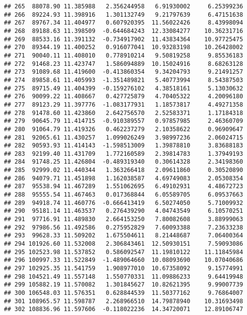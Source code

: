 \documentclass[
]{article}
\begin{document}
\begin{verbatim}
## 265  88078.90 11.385988   2.356244958   6.91930002     6.25399236
## 266  89224.93 11.398916   1.301132749   9.21797639     6.47151638
## 267  89767.34 11.404977   0.607920395  11.56022426     8.43998094
## 268  89188.63 11.398509  -0.644684243  12.33084277    10.36231716
## 269  88533.16 11.391132  -0.734917902  11.43834364    10.97725475
## 270  89344.19 11.400252   0.916077041  10.93283198    10.26428002
## 271  90040.11 11.408010   0.778910214   9.50819258     9.85536183
## 272  91468.23 11.423747   1.586094889  10.15024916     8.68263128
## 273  91089.68 11.419600  -0.413860354   9.34204793     9.21491257
## 274  89858.61 11.405993  -1.351489821   5.40773994     8.54387503
## 275  89715.49 11.404399  -0.159276102   4.38518161     5.13030632
## 276  90099.22 11.408667   0.427725879   4.70405322     4.20096180
## 277  89123.29 11.397776  -1.083177931   1.18573817     4.49271358
## 278  91478.60 11.423860   2.642756570   2.52583371     1.17184318
## 279  90645.79 11.414715  -0.910389557   0.97857985     2.46360709
## 280  91064.79 11.419326   0.462237279   2.10358622     0.96909647
## 281  92065.61 11.430257   1.099026249   3.98997236     2.06024715
## 282  90593.93 11.414143  -1.598513009   1.39878810     3.83688183
## 283  92199.40 11.431709   1.772160589   2.39814783     1.37949193
## 284  91748.25 11.426804  -0.489319340   0.30614328     2.34198360
## 285  92999.02 11.440344   1.363266418   2.09611860     0.30520890
## 286  94079.71 11.451898   1.162038587   4.69749083     2.05308354
## 287  95538.94 11.467289   1.551062695   6.49102931     4.48672723
## 288  95555.54 11.467463   0.017368844   6.05589705     6.09537663
## 289  94918.74 11.460776  -0.666413419   6.50274050     5.71009932
## 290  95181.14 11.463537   0.276439290   4.04743549     6.10570251
## 291  97716.91 11.489830   2.664153250   7.80082608     3.88999063
## 292  97986.56 11.492586   0.275952829   7.60093388     7.23633238
## 293  99628.33 11.509202   1.675504611   8.21448687     7.06400364
## 294 101926.60 11.532008   2.306843461  12.50930151     7.59093086
## 295 102523.98 11.537852   0.586092547  11.19810122    11.11845984
## 296 100997.33 11.522849  -1.489064660  10.08093690    10.07040686
## 297 102925.35 11.541759   1.908977010  10.67358092     9.15774991
## 298 104521.49 11.557148   1.550770331  11.09886233     9.64419948
## 299 105882.19 11.570082   1.301845627  10.82621395     9.99007739
## 300 106548.03 11.576351   0.628844539  11.50377162     9.76864007
## 301 108965.57 11.598787   2.268966510  14.79878940    10.31693498
## 302 108836.96 11.597606  -0.118022236  14.34720071    12.89106747

\end{verbatim}
\end{document}
